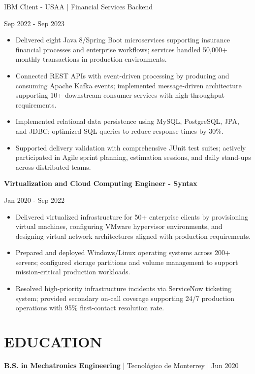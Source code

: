 \documentclass[10pt,a4paper]{article}
\newlength{\rolefontsize}
\newlength{\clientfontsize}
\newlength{\singlelinespacing}
\newlength{\singleseparation}
\newcommand{\role}[1]{
  \vspace{\singleseparation}
  {\fontsize{\rolefontsize}{\singlelinespacing} \selectfont \bfseries #1 \par}
  \nopagebreak}
\newcommand{\client}[1]{
  \vspace{\singleseparation}
  {\fontsize{\clientfontsize}{\singlelinespacing} \selectfont #1 \par} 
  \nopagebreak}
\newcommand{\education}[1]{
  \vspace{\singleseparation} 
  {\bfseries #1}}
\begin{document}
\client{IBM Client - USAA | Financial Services Backend}
Sep 2022 - Sep 2023 \par
\begin{itemize}
  \item Delivered eight Java 8/Spring Boot microservices supporting insurance financial processes and enterprise workflows; services handled 50,000+ monthly transactions in production environments.
  \item Connected REST APIs with event-driven processing by producing and consuming Apache Kafka events; implemented message-driven architecture supporting 10+ downstream consumer services with high-throughput requirements.
  \item Implemented relational data persistence using MySQL, PostgreSQL, JPA, and JDBC; optimized SQL queries to reduce response times by 30\%.
  \item Supported delivery validation with comprehensive JUnit test suites; actively participated in Agile sprint planning, estimation sessions, and daily stand-ups across distributed teams.
\end{itemize}

\newpage

\role{Virtualization and Cloud Computing Engineer - Syntax}
Jan 2020 - Sep 2022 \par
\begin{itemize}
  \item Delivered virtualized infrastructure for 50+ enterprise clients by provisioning virtual machines, configuring VMware hypervisor environments, and designing virtual network architectures aligned with production requirements.
  \item Prepared and deployed Windows/Linux operating systems across 200+ servers; configured storage partitions and volume management to support mission-critical production workloads.
  \item Resolved high-priority infrastructure incidents via ServiceNow ticketing system; provided secondary on-call coverage supporting 24/7 production operations with 95\% first-contact resolution rate.
\end{itemize}

\section*{EDUCATION}
\education{B.S. in Mechatronics Engineering} | Tecnológico de Monterrey | Jun 2020 \par
\end{document}
